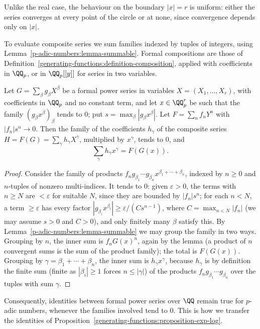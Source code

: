 Unlike the real case, the behaviour on the boundary $|x| = r$ is uniform: either the series converges at every point of the circle or at none, since convergence depends only on $|x|$.

To evaluate composite series we sum families indexed by tuples of integers, using Lemma~\ref{p-adic-numbers:lemma-summable}. Formal compositions are those of
Definition~\ref{generating-functions:definition-composition}, applied with coefficients in $\QQ_p$, or in $\QQ_p[[y]]$ for series in two variables.

\begin{lemma}\label{p-adic-numbers:lemma-substitution}
Let $G = \sum_{\beta}g_\beta X^\beta$ be a formal power series in variables $X = (X_1, \ldots, X_r)$, with coefficients in $\QQ_p$ and no constant term, and let $x \in \QQ_p^r$ be such that the family
$(g_\beta x^\beta)_\beta$ tends to $0$; put $s = \max_\beta|g_\beta x^\beta|$. Let $F = \sum_nf_nY^n$ with $|f_n|s^n \to 0$. Then the family of the coefficients $h_\gamma$ of the composite series
$H = F(G) = \sum_\gamma h_\gamma X^\gamma$, multiplied by $x^\gamma$, tends to $0$, and
\[
\sum_\gamma h_\gamma x^\gamma = F(G(x)) .
\]
\end{lemma}

\begin{proof}
Consider the family of products $f_ng_{\beta_1}\cdots g_{\beta_n}x^{\beta_1 + \cdots + \beta_n}$, indexed by $n \geq 0$ and $n$-tuples of nonzero multi-indices. It tends to $0$: given $\varepsilon > 0$, the terms with
$n \geq N$ are $< \varepsilon$ for suitable $N$, since they are bounded by $|f_n|s^n$; for each $n < N$, a term $\geq \varepsilon$ has every factor $|g_{\beta_i}x^{\beta_i}| \geq \varepsilon/(Cs^{n-1})$, where
$C = \max_{n < N}|f_n|$ (we may assume $s > 0$ and $C > 0$), and only finitely many $\beta$ satisfy this. By Lemma~\ref{p-adic-numbers:lemma-summable} we may group the family in two ways. Grouping by $n$, the inner
sum is $f_nG(x)^n$, again by the lemma (a product of $n$ convergent sums is the sum of the product family); the total is $F(G(x))$. Grouping by $\gamma = \beta_1 + \cdots + \beta_n$, the inner sum is
$h_\gamma x^\gamma$, because $h_\gamma$ is by definition the finite sum (finite as $|\beta_i| \geq 1$ forces $n \leq |\gamma|$) of the products $f_ng_{\beta_1}\cdots g_{\beta_n}$ over the tuples with sum $\gamma$.
\end{proof}

Consequently, identities between formal power series over $\QQ$ remain true for $p$-adic numbers, whenever the families involved tend to $0$. This is how we transfer the identities of
Proposition~\ref{generating-functions:proposition-exp-log}.

